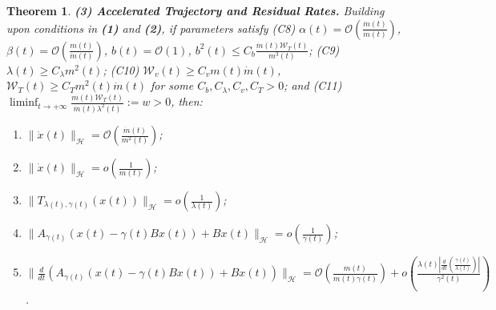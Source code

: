 \documentclass[10pt,a4paper]{amsart}
\newtheorem{theorem}{Theorem}
\begin{document}
\begin{theorem}
\smallskip
\noindent \textbf{(3) Accelerated Trajectory and Residual Rates.} Building upon conditions in \textbf{(1)} and \textbf{(2)}, if parameters satisfy {\rm (C8)} $\alpha(t) = \mathcal{O}( \frac{\dot{m}(t)}{m(t)} )$, $\beta(t) = \mathcal{O}( \frac{m(t)}{\dot{m}(t)} )$, $b(t) = \mathcal{O}(1)$, $b^2(t) \leq C_b \frac{\dot{m}(t) \mathcal{W}_T(t)}{m^3(t)}$; {\rm (C9)} $\lambda(t) \ge C_{\lambda} m^2(t)$; {\rm (C10)} $\mathcal{W}_v(t) \ge C_v m(t)\dot{m}(t)$, $\mathcal{W}_T(t) \ge C_T m^2(t)\dot{m}(t)$ for some $C_b, C_{\lambda}, C_v, C_T > 0$; and {\rm (C11)} $\liminf_{t \to +\infty} \frac{m(t) \mathcal{W}_T(t)}{\dot{m}(t) \lambda^2(t)}:=w > 0$, then:
\begin{enumerate}[label=(\roman*), resume, nosep, itemsep=2pt]
    \item $\|\ddot{x}(t)\|_{\mathcal{H}} = \mathcal{O}\left( \frac{\dot{m}(t)}{m^2(t)} \right)$;
    \item $\|\dot{x}(t)\|_{\mathcal{H}} = o\left( \frac{1}{m(t)} \right)$;
    \item $\|T_{\lambda(t), \gamma(t)}(x(t))\|_{\mathcal{H}} = o\left( \frac{1}{\lambda(t)} \right)$;
    \item $\| A_{\gamma(t)} ( x(t) - \gamma(t) Bx(t) ) + Bx(t) \|_{\mathcal{H}} = o\left( \frac{1}{\gamma(t)} \right)$;
    \item $\| \frac{d}{dt} ( A_{\gamma(t)} ( x(t) - \gamma(t) Bx(t) ) + Bx(t) ) \|_{\mathcal{H}} = \mathcal{O}\left( \frac{\dot{m}(t)}{m(t) \gamma(t)} \right) + o\left( \frac{\lambda(t) | \frac{d}{dt} ( \frac{\gamma(t)}{\lambda(t)} ) |}{\gamma^2(t)} \right)$.
\end{enumerate}
\end{theorem}
\end{document}
